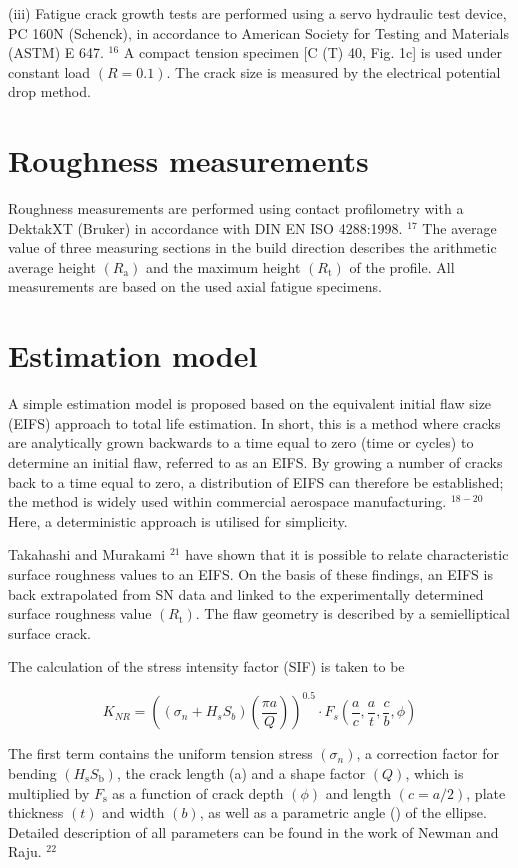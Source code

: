 \documentclass[10pt]{article}
\begin{document}
(iii) Fatigue crack growth tests are performed using a servo hydraulic test device, PC 160N (Schenck), in accordance to American Society for Testing and Materials (ASTM) E 647. ${ }^{16}$ A compact tension specimen [C (T) 40, Fig. 1c] is used under constant load $(R=0.1)$. The crack size is measured by the electrical potential drop method.

\section*{Roughness measurements}
Roughness measurements are performed using contact profilometry with a DektakXT (Bruker) in accordance with DIN EN ISO 4288:1998. ${ }^{17}$ The average value of three measuring sections in the build direction describes the arithmetic average height $\left(R_{\mathrm{a}}\right)$ and the maximum height $\left(R_{\mathrm{t}}\right)$ of the profile. All measurements are based on the used axial fatigue specimens.

\section*{Estimation model}
A simple estimation model is proposed based on the equivalent initial flaw size (EIFS) approach to total life estimation. In short, this is a method where cracks are analytically grown backwards to a time equal to zero (time or cycles) to determine an initial flaw, referred to as an EIFS. By growing a number of cracks back to a time equal to zero, a distribution of EIFS can therefore be established; the method is widely used within commercial aerospace manufacturing. ${ }^{18-20}$ Here, a deterministic approach is utilised for simplicity.

Takahashi and Murakami ${ }^{21}$ have shown that it is possible to relate characteristic surface roughness values to an EIFS. On the basis of these findings, an EIFS is back extrapolated from SN data and linked to the experimentally determined surface roughness value $\left(R_{\mathrm{t}}\right)$. The flaw geometry is described by a semielliptical surface crack.

The calculation of the stress intensity factor (SIF) is taken to be

$$
K_{N R}=\left(\left(\sigma_{n}+H_{s} S_{b}\right)\left(\frac{\pi a}{Q}\right)\right)^{0.5} \cdot F_{s}\left(\frac{a}{c}, \frac{a}{t}, \frac{c}{b}, \phi\right)
$$

The first term contains the uniform tension stress $\left(\sigma_{n}\right)$, a correction factor for bending $\left(H_{\mathrm{s}} S_{\mathrm{b}}\right)$, the crack length (a) and a shape factor $(Q)$, which is multiplied by $F_{\mathrm{s}}$ as a function of crack depth $(\phi)$ and length $(c=a / 2)$, plate thickness $(t)$ and width $(b)$, as well as a parametric angle () of the ellipse. Detailed description of all parameters can be found in the work of Newman and Raju. ${ }^{22}$
\end{document}
